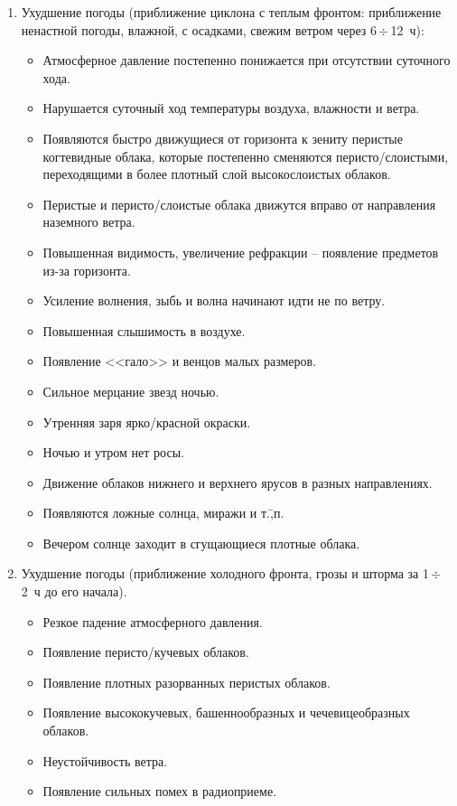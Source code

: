 \documentclass[a4paper, 12pt, twoside, final, book, russian, fittopage, cyremdash]{ncc}
\newcommand{\otdo}{\,\ensuremath{\div}\,}
\begin{document}
\begin{enumerate}
\item Ухудшение погоды (приближение циклона с теплым фронтом: приближение ненастной погоды, влажной, с осадками, свежим ветром через 6\otdo 12~ч):
  \begin{itemize}
  \item Атмосферное давление постепенно понижается при отсутствии суточного хода.
  \item Нарушается суточный ход температуры воздуха, влажности и ветра.
  \item Появляются быстро движущиеся от горизонта к зениту перистые когтевидные облака, которые постепенно сменяются перисто\-/слоистыми, переходящими в более плотный слой высокослоистых облаков.
  \item Перистые и перисто\-/слоистые облака движутся вправо от направления наземного ветра.
  \item Повышенная видимость, увеличение рефракции \--- появление предметов из-за горизонта.
  \item Усиление волнения, зыбь и волна начинают идти не по ветру.
  \item Повышенная слышимость в воздухе.
  \item Появление <<гало>> и венцов малых размеров.
  \item Сильное мерцание звезд ночью.
  \item Утренняя заря ярко\-/красной окраски.
  \item Ночью и утром нет росы.
  \item Движение облаков нижнего и верхнего ярусов в разных направлениях.
  \item Появляются ложные солнца, миражи и т.\=,п.
  \item Вечером солнце заходит в сгущающиеся плотные облака.
  \end{itemize}
\item Ухудшение погоды (приближение холодного фронта, грозы и шторма за 1\otdo 2~ч до его начала).
  \begin{itemize}
  \item Резкое падение атмосферного давления.
  \item Появление перисто\-/кучевых облаков.
  \item Появление плотных разорванных перистых облаков.
  \item Появление высококучевых, башеннообразных и чечевицеобразных облаков.
  \item Неустойчивость ветра.
  \item Появление сильных помех в радиоприеме.

\end{itemize}
\end{enumerate}
\end{document}
